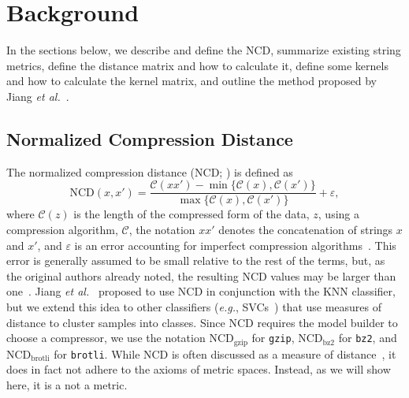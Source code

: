 \documentclass[preprint,12pt]{article}
\begin{document}
\section{Background}

In the sections below, we describe and define the NCD, summarize existing string metrics, define the distance matrix and how to calculate it, define some kernels and how to calculate the kernel matrix, and outline the method proposed by Jiang \textit{et al.}~\cite{jiang2022less}.



\subsection{Normalized Compression Distance}
\label{ncd}
The normalized compression distance (NCD; \cite{ncd}) is defined as
\begin{equation}
    \text{NCD}(x, x') = \frac{\mathcal{C}(xx') - \min\{\mathcal{C}(x), \mathcal{C}(x')\}}{\max\{\mathcal{C}(x), \mathcal{C}(x')\}} + \varepsilon,
\end{equation}
where $\mathcal{C}(z)$ is the length of the compressed form of the data, $z$, using a compression algorithm, $\mathcal{C}$, the notation $xx'$ denotes the concatenation of strings $x$ and $x'$, and $\varepsilon$ is an error accounting for imperfect compression algorithms~\cite{ncd}. This error is generally assumed to be small relative to the rest of the terms, but, as the original authors already noted, the resulting NCD values may be larger than one~\cite{ncd}.
Jiang \textit{et al.}~\cite{jiang2022less} proposed to use NCD in conjunction with the KNN classifier, but we extend this idea to other classifiers (\textit{e.g.}, SVCs~\cite{vapnik1994measuring}) that use measures of distance to cluster samples into classes. 
Since NCD requires the model builder to choose a compressor, we use the notation $\text{NCD}_{\text{gzip}}$ for \texttt{gzip}, $\text{NCD}_{\text{bz2}}$ for \texttt{bz2}, and $\text{NCD}_{\text{brotli}}$ for \texttt{brotli}. 
\label{pseudometric}
\label{metric_spaces}
While NCD is often discussed as a measure of distance~\cite{opitz2023gzip,weinreich2023parameter,nishida2011tweet,jiang2022less,ncd}, it does in fact not adhere to the axioms of metric spaces. 
Instead, as we will show here, it is a not a metric.
\end{document}
